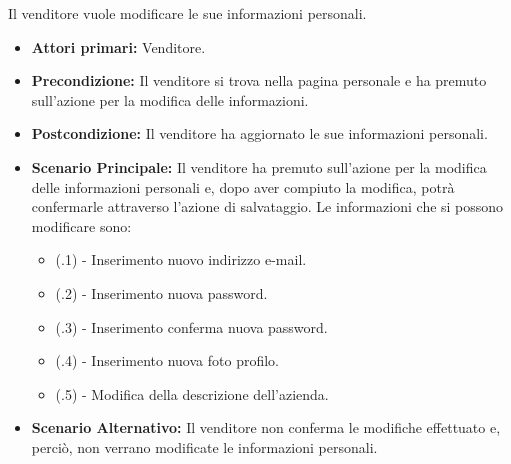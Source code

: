 
Il venditore vuole modificare le sue informazioni personali.
\begin{itemize}
    \item \textbf{Attori primari:} Venditore.
    \item \textbf{Precondizione:} Il venditore si trova nella pagina personale e ha premuto sull'azione per la modifica delle informazioni.
    \item \textbf{Postcondizione:} Il venditore ha aggiornato le sue informazioni personali.
    \item \textbf{Scenario Principale:} Il venditore ha premuto sull'azione per la modifica delle informazioni personali e, dopo aver compiuto la modifica, potrà confermarle attraverso l'azione di salvataggio. Le informazioni che si possono modificare sono:
    \begin{itemize}
        \item (\actualUC.1) - Inserimento nuovo indirizzo e-mail.
        \item (\actualUC.2) - Inserimento nuova password.
        \item (\actualUC.3) - Inserimento conferma nuova password.
        \item (\actualUC.4) - Inserimento nuova foto profilo.
        \item (\actualUC.5) - Modifica della descrizione dell'azienda.
    \end{itemize}
    \item \textbf{Scenario Alternativo:} Il venditore non conferma le modifiche effettuato e, perciò, non verrano modificate le informazioni personali.
\end{itemize}

\resetSubUC

